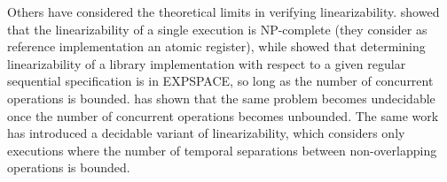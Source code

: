 Others have considered the theoretical limits in verifying linearizability.
\citet{journals/siamcomp/GibbonsK97} showed that the linearizability of a
single execution is NP-complete (they consider as reference implementation an atomic register), 
while \citet{journals/iandc/AlurMP00} showed
that determining linearizability of a library implementation with respect to a
given regular sequential specification is in EXPSPACE, so long as the number of
concurrent operations is bounded. \citet{conf/esop/BouajjaniEEH13} has shown that the same
problem becomes undecidable once the number of concurrent operations becomes
unbounded. The same work has introduced a decidable variant of linearizability, which
considers only executions where the number of temporal separations between non-overlapping 
operations is bounded.
%
